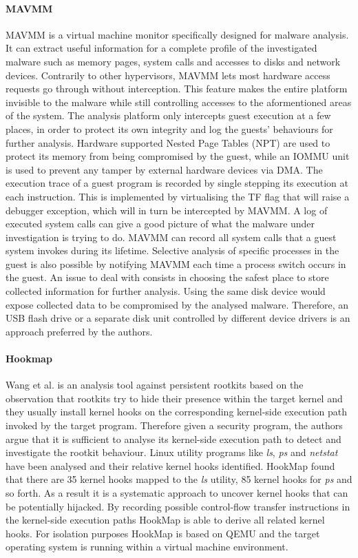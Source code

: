 \paragraph{MAVMM}
MAVMM \cite{MAVMM} is a virtual machine monitor specifically designed for malware analysis. It can extract useful information for a complete profile of the investigated malware such as memory pages, system calls and accesses to disks and network devices. Contrarily to other hypervisors, MAVMM lets most hardware access requests go through without interception. This feature makes the entire platform invisible to the malware while still controlling accesses to the aformentioned areas of the system. The analysis platform only intercepts guest execution at a few places, in order to protect its own integrity and log the guests' behaviours for further analysis. Hardware supported Nested Page Tables (NPT) are used to protect its memory from being compromised by the guest, while an IOMMU unit is used to prevent any tamper by external hardware devices via DMA.
The execution trace of a guest program is recorded by single stepping its execution at each instruction. This is implemented by virtualising the TF flag that will raise a debugger exception, which will in turn be intercepted by MAVMM. 
A log of executed system calls can give a good picture of what the malware under investigation is trying to do. MAVMM can record all system calls that a guest system invokes during its lifetime. Selective analysis of specific processes in the guest is also possible by notifying MAVMM each time a process switch occurs in the guest.
An issue to deal with consists in choosing the safest place to store collected information for further analysis. Using the same disk device would expose collected data to be compromised by the analysed malware. Therefore, an USB flash drive or a separate disk unit controlled by different device drivers is an approach preferred by the authors.



\paragraph{Hookmap}
Wang et al. \cite{hookmap} is an analysis tool against persistent rootkits based on the observation that rootkits try to hide their presence within the target kernel and they usually install kernel hooks on the corresponding kernel-side execution path invoked by the target program. Therefore given a security program, the authors argue that it is sufficient to analyse its kernel-side execution path to detect and investigate the rootkit behaviour. Linux utility programs like \emph{ls}, \emph{ps} and \emph{netstat} have been analysed and their relative kernel hooks identified. HookMap found that there are 35 kernel hooks mapped to the \emph{ls} utility, 85 kernel hooks for \emph{ps} and so forth. As a result it is a systematic approach to uncover kernel hooks that can be potentially hijacked. By recording possible control-flow transfer instructions in the kernel-side execution paths HookMap is able to derive all related kernel hooks. For isolation purposes HookMap is based on QEMU and the target operating system is running within a virtual machine environment. 


